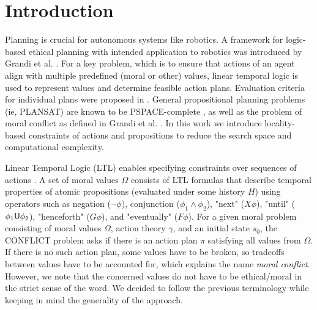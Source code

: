 \documentclass[]{jair}
\begin{document}


\received{}
\received[accepted]{}

\maketitle

\section{Introduction}

Planning is crucial for autonomous systems like robotics. A framework for logic-based ethical planning with intended application to robotics was introduced by Grandi et al. \cite{grandi2022logic}. For a key problem, which is to ensure that actions of an agent align with multiple predefined (moral or other) values, linear temporal logic is used to represent values and determine feasible action plans. Evaluation criteria for individual plans were proposed in \cite{grandi2023moral}. General propositional planning problems (ie, PLANSAT) are known to be PSPACE-complete \cite{BYLANDER1994165}, as well as the problem of moral conflict as defined in Grandi et al. \cite{grandi2022logic}. In this work we introduce locality-based constraints of actions and propositions to reduce the search space and computational complexity. 

Linear Temporal Logic (LTL) enables specifying constraints over sequences of actions \cite{10.5555/975331}.
A set of moral values $\Omega$ consists of LTL formulas \cite{4567924} that describe temporal properties of atomic propositions (evaluated under some history $H$) using operators such as negation ($\neg \phi$), conjunction ($\phi_1\land \phi_2$), "next" ($X\phi$), "until" ($\phi_1 \sf{U} \phi_2$), "henceforth" ($G\phi$), and "eventually" ($F\phi$). For a given moral problem consisting of moral values $\Omega$, action theory $\gamma$, and an initial state $s_0$, the CONFLICT problem asks if there is an action plan $\pi$ satisfying all values from $\Omega$. If there is no such action plan, some values have to be broken, so tradeoffs between values have to be accounted for, which explains the name {\it moral conflict}. However, we note that the concerned values do not have to be ethical/moral in the strict sense of the word. We decided to follow the previous terminology while keeping in mind the generality of the approach.
\end{document}
